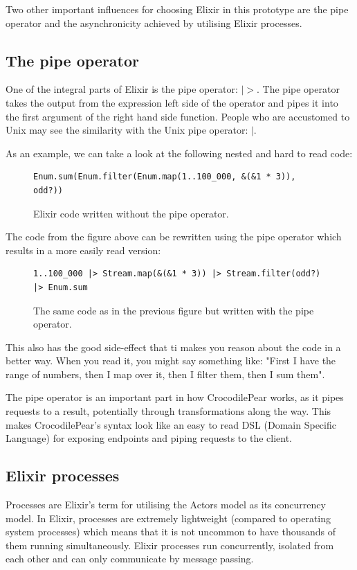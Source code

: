 \documentclass{cslthse-msc}
\begin{document}
Two other important influences for choosing Elixir in this prototype are the pipe operator and the asynchronicity achieved by utilising Elixir processes.

\subsection{The pipe operator}
One of the integral parts of Elixir is the pipe operator: $|>$. The pipe operator takes the output from the expression left side of the operator and pipes it into the first argument of the right hand side function. People who are accustomed to Unix may see the similarity with the Unix pipe operator: $|$.

As an example, we can take a look at the following nested and hard to read code:

\begin{figure}[H]
  \centering
\begin{lstlisting}[breaklines=true,frame=single]
Enum.sum(Enum.filter(Enum.map(1..100_000, &(&1 * 3)), odd?))
\end{lstlisting}
  \caption{Elixir code written without the pipe operator.}
\end{figure}

The code from the figure above can be rewritten using the pipe operator which results in a more easily read version:

\begin{figure}[H]
  \centering
\begin{lstlisting}[breaklines=true,frame=single]
1..100_000 |> Stream.map(&(&1 * 3)) |> Stream.filter(odd?) |> Enum.sum
\end{lstlisting}
  \caption{The same code as in the previous figure but written with the pipe operator.}
\end{figure}

This also has the good side-effect that ti makes you reason about the code in a better way. When you read it, you might say something like: "First I have the range of numbers, then I map over it, then I filter them, then I sum them".

The pipe operator is an important part in how CrocodilePear works, as it pipes requests to a result, potentially through transformations along the way. This makes CrocodilePear's syntax look like an easy to read DSL (Domain Specific Language) for exposing endpoints and piping requests to the client.

\subsection{Elixir processes}
Processes are Elixir's term for utilising the Actors model as its concurrency model. In Elixir, processes are extremely lightweight (compared to operating system processes) which means that it is not uncommon to have thousands of them running simultaneously. Elixir processes run concurrently, isolated from each other and can only communicate by message passing\cite{elixir_processes}.
\end{document}
